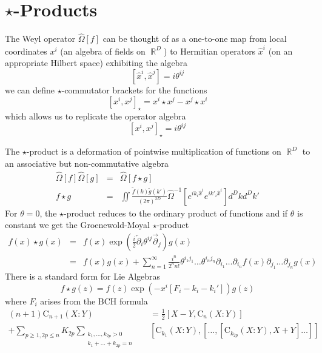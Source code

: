 \documentclass[a4,12pt,titlepage]{seminar}
\DeclareMathOperator{\real}{{\mathbb R}}                %
\newcommand{\cb}[2]{\left[#1,#2\right]}                 %
\newcommand{\scb}[2]{\left[#1,#2\right]_\star}          %
\begin{document}
\clearpage
\section{$\star$-Products}

The Weyl operator ${\hat\Omega}[f]$ can be thought of as a one-to-one map from local
coordinates $x^i$ (an algebra of fields on $\real^D$) to Hermitian operators
$\hat{x}^i$ (on an appropriate Hilbert space) exhibiting the algebra
\begin{equation*}
  \cb{\hat{x}^i}{\hat{x}^j}=i\theta^{ij}
\end{equation*}
we can define $\star$-commutator brackets for the functions
\begin{equation*}
  \scb{x^i}{x^j}=x^i\star x^j-x^j\star x^i
\end{equation*}
which allows us to replicate the operator algebra
\begin{equation*}
  \scb{x^i}{x^j}=i\theta^{ij}
\end{equation*}

The $\star$-product is a deformation of pointwise multiplication of functions on
$\real^D$ to an associative but non-commutative algebra
\begin{eqnarray*}
  {\hat\Omega}[f]{\hat\Omega}[g]&=&{\hat\Omega}[f\star g]\\
  f\star g &=& \iint
  \frac{\widetilde{f}(k)\widetilde{g}(k')}{(2\pi)^{2D}}{\hat\Omega}^{-1}[
  e^{ik_i\hat{x}^i}e^{ik'_i\hat{x}^i}]d^Dkd^Dk'
\end{eqnarray*}
For $\theta=0$, the $\star$-product reduces to the ordinary product of functions
and if $\theta$ is constant we get the Groenewold-Moyal $\star$-product
\begin{eqnarray*}
  f(x)\star g(x)&=&f(x)\exp\left(\frac{i}{2}\overleftarrow\partial_i
    \theta^{ij}\overrightarrow\partial_j\right)g(x)\\ \nonumber
  &=& f(x)g(x)+
  \sum_{n=1}^\infty
  \frac{i^n}{2^nn!}\theta^{i_1j_1}\ldots\theta^{i_nj_n}
  \partial_{i_1}\ldots\partial_{i_n}f(x)\partial_{j_1}\ldots\partial_{j_n}g(x)
\end{eqnarray*}
There is a standard form for Lie Algebras
\begin{equation*}
  f\star g(z)=f(z)\exp\left(-x^i\left[F_i-k_i-k_i'\right]\right)g(z)
\end{equation*}
where $F_i$ arises from the BCH formula
\begin{eqnarray*}
  (n+1)\mathrm{C}_{n+1}(X:Y)&&=\frac 12 \cb{X-Y}{\mathrm{C}_n(X:Y)}
  \\ \nonumber + \sum_{p \ge 1, 2p \le n} K_{2p}\!\!\!\!\!
  \sum_{\substack{k_1,\ldots,k_{2p}> 0 \\ k_1+\ldots+k_{2p}=n }}&&
  \!\!\!\!\!\!\!\!\!\!\cb{\mathrm{C}_{k_1}(X:Y)}
  {\left[\ldots,\cb{\mathrm{C}_{k_{2p}}(X:Y)}{X+Y}\ldots\right]}
\end{eqnarray*}
\end{document}
